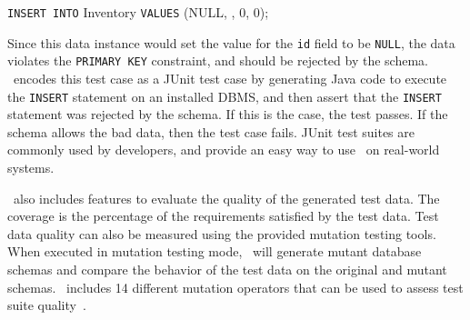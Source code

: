 % 

\vspace*{.1in}
\texttt{INSERT INTO} Inventory \texttt{VALUES} (NULL, \textquotesingle\textquotesingle, 0, 0); 
\vspace*{.1in}

Since this data instance would set the value for the \texttt{id} field to be \texttt{NULL}, the data violates the
\texttt{PRIMARY KEY} constraint, and should be rejected by the schema.  \sa~encodes this test case as a JUnit test case
by generating Java code to execute the \texttt{INSERT} statement on an installed DBMS, and then assert that the
\texttt{INSERT} statement was rejected by the schema. If this is the case, the test passes.  If the schema allows the
bad data, then the test case fails. JUnit test suites are commonly used by developers, and provide an easy way to use
\sa~on real-world systems.

\sa~also includes features to evaluate the quality of the generated test data. The coverage is the percentage of the
requirements satisfied by the test data.  Test data quality can also be measured using the provided mutation testing
tools. When executed in mutation testing mode, \sa~will generate mutant database schemas and compare the behavior of the
test data on the original and mutant schemas. \sa~includes 14 different mutation operators that can be used to assess
test suite quality~\cite{wright2015mutation}.



